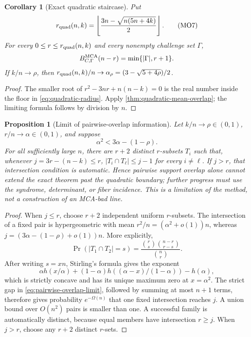 \documentclass[11pt,a4paper]{amsart}
\numberwithin{equation}{section}
\newtheorem{proposition}[proposition]{Proposition}
\newtheorem{corollary}[corollary]{Corollary}
\theoremstyle{remark}
\newcommand{\abs}[1]{\lvert #1\rvert}
\newcommand{\floor}[1]{\left\lfloor #1\right\rfloor}
\begin{document}
\begin{corollary}[Exact quadratic staircase]
\label{cor:mean-overlap-exact}
Put
\[
 r_{\rm quad}(n,k)=
 \floor{\frac{3n-\sqrt{n(5n+4k)}}2}.
 \tag{MO7}\label{eq:quadratic-radius}
\]
For every \(0\le r\le r_{\rm quad}(n,k)\) and every nonempty challenge
set \(\Gamma\),
\[
 B_{C,\Gamma}^{\rm MCA}(n-r)=\min\{\abs\Gamma,r+1\}.
\]
If \(k/n\to\rho\), then
\(r_{\rm quad}(n,k)/n\to
\alpha_\rho=(3-\sqrt{5+4\rho})/2\).
\end{corollary}

\begin{proof}
The smaller root of \(r^2-3nr+n(n-k)=0\) is the real number inside the
floor in \eqref{eq:quadratic-radius}.  Apply
\cref{thm:quadratic-mean-overlap}; the limiting formula follows by
division by \(n\).
\end{proof}

\begin{proposition}[Limit of pairwise-overlap information]
\label{prop:pairwise-overlap-limit}
Let \(k/n\to\rho\in(0,1)\), \(r/n\to\alpha\in(0,1)\), and suppose
\[
 \alpha^2<3\alpha-(1-\rho).
 \tag{MO8}\label{eq:pairwise-overlap-limit}
\]
For all sufficiently large \(n\), there are \(r+2\) distinct
\(r\)-subsets \(T_i\) such that, whenever
\(j=3r-(n-k)\le r\),
\(\abs{T_i\cap T_\ell}\le j-1\) for every \(i\ne\ell\).  If \(j>r\),
that intersection condition is automatic.  Hence pairwise support overlap
alone cannot extend the exact theorem past the quadratic boundary; further
progress must use the syndrome, determinant, or fiber incidence.  This is
a limitation of the method, not a construction of an MCA-bad line.
\end{proposition}

\begin{proof}
When \(j\le r\), choose \(r+2\) independent uniform \(r\)-subsets.
The intersection of a fixed pair is hypergeometric with mean
\(r^2/n=(\alpha^2+o(1))n\), whereas
\(j=(3\alpha-(1-\rho)+o(1))n\).  More explicitly,
\[
 \Pr(\abs{T_1\cap T_2}=s)
 =\frac{\binom rs\binom{n-r}{r-s}}{\binom nr}.
\]
After writing \(s=xn\), Stirling's formula gives the exponent
\[
 \alpha h(x/\alpha)+(1-\alpha)
 h((\alpha-x)/(1-\alpha))-h(\alpha),
\]
which is strictly concave and has its unique maximum zero at
\(x=\alpha^2\).  The strict gap in
\eqref{eq:pairwise-overlap-limit}, followed by summing at most \(n+1\)
terms, therefore gives probability \(e^{-\Omega(n)}\) that one fixed
intersection reaches \(j\).  A union bound over \(O(n^2)\) pairs is
smaller than one.  A
successful family is automatically distinct, because equal members have
intersection \(r\ge j\).  When \(j>r\), choose any \(r+2\) distinct
\(r\)-sets.
\end{proof}
\end{document}
